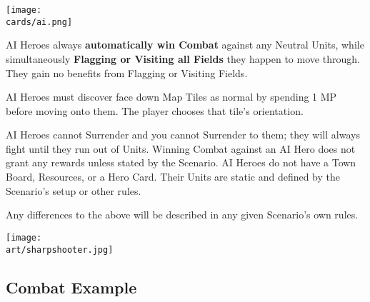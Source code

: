 \begin{multicols}{2}
\begin{center}
  \texttt{[image: \\cards/ai.png]}
\end{center}

AI Heroes always \textbf{automatically win Combat} against any Neutral Units, while simultaneously \textbf{Flagging or Visiting all Fields} they happen to move through.
They gain no benefits from Flagging or Visiting Fields.

AI Heroes must discover face down Map Tiles as normal by spending 1 MP before moving onto them.
The player chooses that tile's orientation.\par
AI Heroes cannot Surrender and you cannot Surrender to them;
they will always fight until they run out of Units.
Winning Combat against an AI Hero does not grant any rewards unless stated by the Scenario.
AI Heroes do not have a Town Board, Resources, or a Hero Card.
Their Units are static and defined by the Scenario's setup or other rules.\par
Any differences to the above will be described in any given Scenario's own rules.


\end{multicols}

\vspace*{\fill}
\begin{scaledfigure}[blanker]
  \centering
  \texttt{[image: \\art/sharpshooter.jpg]}
\end{scaledfigure}

\clearpage

\subsection*{Combat Example}

